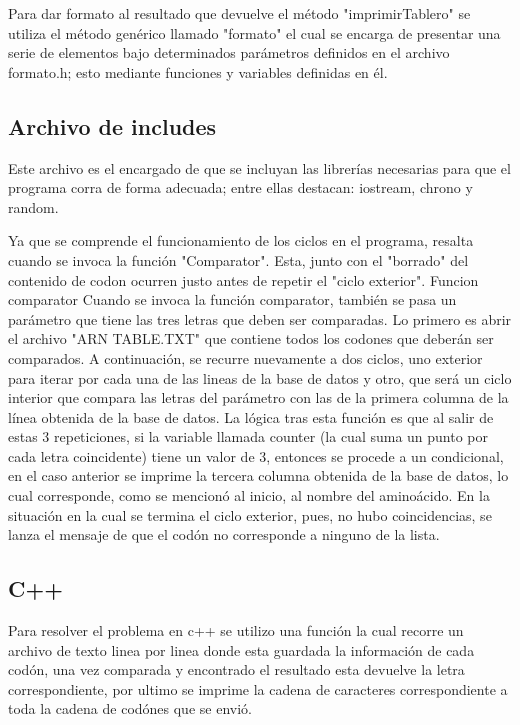 	Para dar formato al resultado que devuelve el método "imprimirTablero" se utiliza
el método genérico llamado "formato" el cual se encarga de presentar una serie de elementos
bajo determinados parámetros definidos en el archivo formato.h; esto mediante funciones y
variables definidas en él. 

\subsection{Archivo de includes}

	Este archivo es el encargado de que se incluyan las librerías necesarias para que
el programa corra de forma adecuada; entre ellas destacan: iostream, chrono y random.
	




	

Ya que se comprende el funcionamiento de los ciclos en el programa, resalta cuando
se invoca la función "Comparator". Esta, junto con el "borrado" del contenido de codon ocurren
justo antes de repetir el "ciclo exterior".
Funcion comparator
Cuando se invoca la función comparator, también se pasa un parámetro que tiene las
tres letras que deben ser comparadas. Lo primero es abrir el archivo "ARN TABLE.TXT" que
contiene todos los codones que deberán ser comparados. A continuación, se recurre
nuevamente a dos ciclos, uno exterior para iterar por cada una de las lineas de la base de
datos y otro, que será un ciclo interior que compara las letras del parámetro con las de la
primera columna de la línea obtenida de la base de datos.
La lógica tras esta función es que al salir de estas 3 repeticiones, si la variable llamada
counter (la cual suma un punto por cada letra coincidente) tiene un valor de 3, entonces se
procede a un condicional, en el caso anterior se imprime la tercera columna obtenida de la
base de datos, lo cual corresponde, como se mencionó al inicio, al nombre del aminoácido. En
la situación en la cual se termina el ciclo exterior, pues, no hubo coincidencias, se lanza el
mensaje de que el codón no corresponde a ninguno de la lista.

\subsection{C++}
Para resolver el problema en c++ se utilizo una función la cual recorre un archivo de texto linea por linea donde esta guardada la información de cada codón, una vez comparada y encontrado el resultado esta devuelve la letra correspondiente, por ultimo se imprime la cadena de caracteres correspondiente a toda la cadena de codónes que se envió.
 
